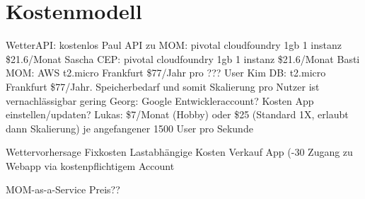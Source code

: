\section{Kostenmodell}

WetterAPI: kostenlos
Paul API zu MOM: pivotal cloudfoundry 1gb 1 instanz \$21.6/Monat
Sascha CEP: pivotal cloudfoundry 1gb 1 instanz \$21.6/Monat
Basti MOM: AWS t2.micro Frankfurt \$77/Jahr pro ??? User
Kim DB: t2.micro Frankfurt \$77/Jahr. Speicherbedarf und somit Skalierung pro Nutzer ist vernachlässigbar gering 
Georg:  Google Entwickleraccount? Kosten App einstellen/updaten?
Lukas: \$7/Monat (Hobby) oder \$25 (Standard 1X, erlaubt dann Skalierung) je angefangener 1500 User pro Sekunde


Wettervorhersage
Fixkosten
Lastabhängige Kosten
Verkauf App (-30%
Zugang zu Webapp via kostenpflichtigem Account

MOM-as-a-Service
Preis?? 
